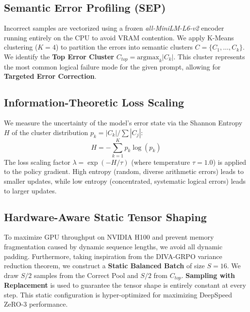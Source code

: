\documentclass[runningheads]{llncs}
\begin{document}
\subsection{Semantic Error Profiling (SEP)}
Incorrect samples are vectorized using a frozen \textit{all-MiniLM-L6-v2} encoder running entirely on the CPU to avoid VRAM contention. We apply K-Means clustering ($K=4$) to partition the errors into semantic clusters $C = \{C_1, \dots, C_k\}$. We identify the \textbf{Top Error Cluster} $C_{top} = \text{argmax}_k |C_k|$. This cluster represents the most common logical failure mode for the given prompt, allowing for \textbf{Targeted Error Correction}.

\subsection{Information-Theoretic Loss Scaling}
We measure the uncertainty of the model's error state via the Shannon Entropy $H$ of the cluster distribution $p_k = |C_k| / \sum |C_j|$:
\begin{equation}
H = - \sum_{k=1}^K p_k \log(p_k)
\end{equation}
The loss scaling factor $\lambda = \exp(-H/\tau)$ (where temperature $\tau=1.0$) is applied to the policy gradient. High entropy (random, diverse arithmetic errors) leads to smaller updates, while low entropy (concentrated, systematic logical errors) leads to larger updates.

\subsection{Hardware-Aware Static Tensor Shaping}
To maximize GPU throughput on NVIDIA H100 and prevent memory fragmentation caused by dynamic sequence lengths, we avoid all dynamic padding. Furthermore, taking inspiration from the DIVA-GRPO variance reduction theorem, we construct a \textbf{Static Balanced Batch} of size $S=16$. We draw $S/2$ samples from the Correct Pool and $S/2$ from $C_{top}$. \textbf{Sampling with Replacement} is used to guarantee the tensor shape is entirely constant at every step. This static configuration is hyper-optimized for maximizing DeepSpeed ZeRO-3 performance.
\end{document}
